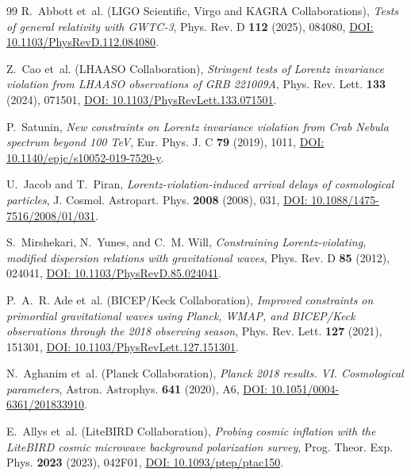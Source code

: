 \documentclass[11pt,a4paper,reqno]{amsart}
\theoremstyle{definition}
\numberwithin{equation}{section}
\begin{document}
\begin{thebibliography}{99}
R.~Abbott et~al. (LIGO Scientific, Virgo and KAGRA Collaborations),
\emph{Tests of general relativity with GWTC-3},
Phys. Rev. D \textbf{112} (2025), 084080, \href{https://doi.org/10.1103/PhysRevD.112.084080}{DOI: 10.1103/PhysRevD.112.084080}.

Z.~Cao et~al. (LHAASO Collaboration),
\emph{Stringent tests of Lorentz invariance violation from LHAASO observations of GRB 221009A},
Phys. Rev. Lett. \textbf{133} (2024), 071501, \href{https://doi.org/10.1103/PhysRevLett.133.071501}{DOI: 10.1103/PhysRevLett.133.071501}.

P.~Satunin,
\emph{New constraints on Lorentz invariance violation from Crab Nebula spectrum beyond 100 TeV},
Eur. Phys. J. C \textbf{79} (2019), 1011, \href{https://doi.org/10.1140/epjc/s10052-019-7520-y}{DOI: 10.1140/epjc/s10052-019-7520-y}.

U.~Jacob and T.~Piran,
\emph{Lorentz-violation-induced arrival delays of cosmological particles},
J. Cosmol. Astropart. Phys. \textbf{2008} (2008), 031, \href{https://doi.org/10.1088/1475-7516/2008/01/031}{DOI: 10.1088/1475-7516/2008/01/031}.

S.~Mirshekari, N.~Yunes, and C.~M. Will,
\emph{Constraining Lorentz-violating, modified dispersion relations with gravitational waves},
Phys. Rev. D \textbf{85} (2012), 024041, \href{https://doi.org/10.1103/PhysRevD.85.024041}{DOI: 10.1103/PhysRevD.85.024041}.

P.~A.~R. Ade et~al. (BICEP/Keck Collaboration),
\emph{Improved constraints on primordial gravitational waves using Planck, WMAP, and BICEP/Keck observations through the 2018 observing season},
Phys. Rev. Lett. \textbf{127} (2021), 151301, \href{https://doi.org/10.1103/PhysRevLett.127.151301}{DOI: 10.1103/PhysRevLett.127.151301}.

N.~Aghanim et~al. (Planck Collaboration),
\emph{Planck 2018 results. VI. Cosmological parameters},
Astron. Astrophys. \textbf{641} (2020), A6, \href{https://doi.org/10.1051/0004-6361/201833910}{DOI: 10.1051/0004-6361/201833910}.

E.~Allys et~al. (LiteBIRD Collaboration),
\emph{Probing cosmic inflation with the LiteBIRD cosmic microwave background polarization survey},
Prog. Theor. Exp. Phys. \textbf{2023} (2023), 042F01, \href{https://doi.org/10.1093/ptep/ptac150}{DOI: 10.1093/ptep/ptac150}.


\end{thebibliography}
\end{document}
